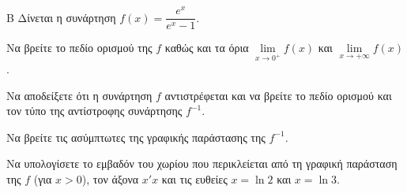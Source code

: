 \begin{thema}{Β}
Δίνεται η συνάρτηση $f(x) = \dfrac{e^x}{e^x-1}$.
\begin{erwthma}
\item Να βρείτε το πεδίο ορισμού της $f$ καθώς και τα όρια $\lim\limits_{x \to 0^+} f(x)$ και $\lim\limits_{x \to +\infty} f(x)$.
\item Να αποδείξετε ότι η συνάρτηση $f$ αντιστρέφεται και να βρείτε το πεδίο ορισμού και τον τύπο της αντίστροφης συνάρτησης $f^{-1}$.
\item Να βρείτε τις ασύμπτωτες της γραφικής παράστασης της $f^{-1}$.
\item Να υπολογίσετε το εμβαδόν του χωρίου που περικλείεται από τη γραφική παράσταση της $f$ (για $x>0$), τον άξονα $x'x$ και τις ευθείες $x=\ln 2$ και $x=\ln 3$.
\end{erwthma}
\end{thema}
